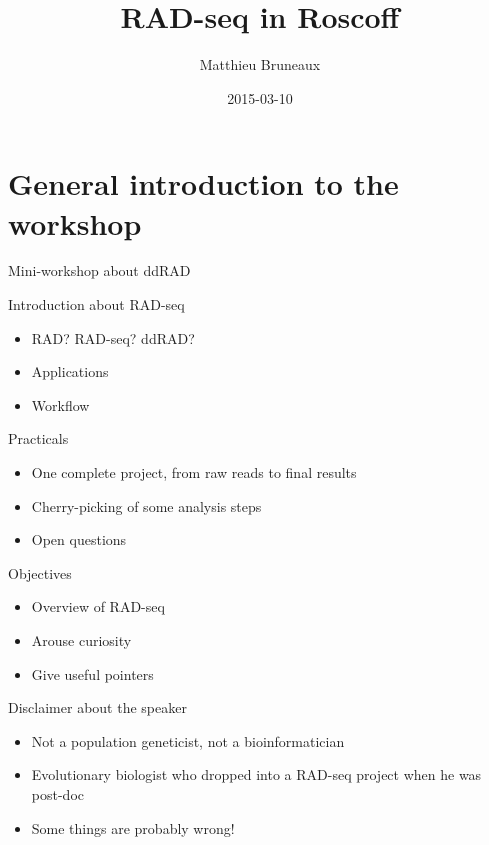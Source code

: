 \documentclass[big]{beamer}
\author{Matthieu Bruneaux}
\date{2015-03-10}
\title{RAD-seq in Roscoff}
\begin{document}
\maketitle

\section{General introduction to the workshop}
\label{sec-1}

\begin{frame}[label=sec-1-1]{Mini-workshop about ddRAD}
\begin{block}{Introduction about RAD-seq}
\begin{itemize}
\item RAD? RAD-seq? ddRAD?
\item Applications
\item Workflow
\end{itemize}
\end{block}
\begin{block}{Practicals}
\begin{itemize}
\item One complete project, from raw reads to final results
\item Cherry-picking of some analysis steps
\item Open questions
\end{itemize}
\end{block}
\begin{block}{Objectives}
\begin{itemize}
\item Overview of RAD-seq
\item Arouse curiosity
\item Give useful pointers
\end{itemize}
\end{block}
\end{frame}
\begin{frame}[label=sec-1-2]{Disclaimer about the speaker}
\begin{block}{}
\begin{itemize}
\item Not a population geneticist, not a bioinformatician
\item Evolutionary biologist who dropped into a RAD-seq project when he was
post-doc
\item Some things are probably wrong!
\end{itemize}
\end{block}
\end{frame}
\end{document}
